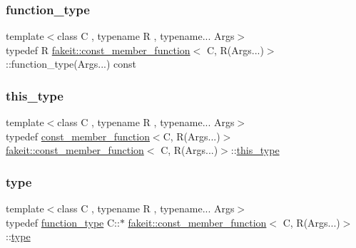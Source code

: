 \subsubsection{\texorpdfstring{function\_type}{function\_type}}
{\footnotesize\ttfamily template$<$class C , typename R , typename... Args$>$ \\
typedef R \mbox{\hyperlink{classfakeit_1_1const__member__function}{fakeit\+::const\+\_\+member\+\_\+function}}$<$ C, R(Args...)$>$\+::function\+\_\+type(Args...) const}

\mbox{\label{classfakeit_1_1const__member__function_3_01C_00_01R_07Args_8_8_8_08_4_af7e34265af3f3daedfe6c23d7cd2f36f}} 
\subsubsection{\texorpdfstring{this\_type}{this\_type}}
{\footnotesize\ttfamily template$<$class C , typename R , typename... Args$>$ \\
typedef \mbox{\hyperlink{classfakeit_1_1const__member__function}{const\+\_\+member\+\_\+function}}$<$C, R(Args...)$>$ \mbox{\hyperlink{classfakeit_1_1const__member__function}{fakeit\+::const\+\_\+member\+\_\+function}}$<$ C, R(Args...)$>$\+::\mbox{\hyperlink{classfakeit_1_1const__member__function_3_01C_00_01R_07Args_8_8_8_08_4_af7e34265af3f3daedfe6c23d7cd2f36f}{this\+\_\+type}}}

\mbox{\label{classfakeit_1_1const__member__function_3_01C_00_01R_07Args_8_8_8_08_4_ab962f803e5a8b5b2078ee8674900288c}} 
\subsubsection{\texorpdfstring{type}{type}}
{\footnotesize\ttfamily template$<$class C , typename R , typename... Args$>$ \\
typedef \mbox{\hyperlink{classfakeit_1_1const__member__function_3_01C_00_01R_07Args_8_8_8_08_4_ad143de99770cbbb20eeb588365312860}{function\+\_\+type}} C\+::$\ast$ \mbox{\hyperlink{classfakeit_1_1const__member__function}{fakeit\+::const\+\_\+member\+\_\+function}}$<$ C, R(Args...)$>$\+::\mbox{\hyperlink{classfakeit_1_1const__member__function_3_01C_00_01R_07Args_8_8_8_08_4_ab962f803e5a8b5b2078ee8674900288c}{type}}}



